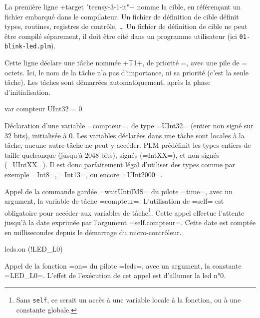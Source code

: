 La première ligne \plm+target "teensy-3-1-it"+ nomme la cible, en référençant un fichier embarqué dans le compilateur. Un fichier de définition de cible définit types, routines, registres de contrôle, … Un fichier de définition de cible ne peut être compilé séparement, il doit être cité dans un programme utilisateur (ici \texttt{01-blink-led.plm}).

\begin{PLM}[3]
task T1 priority 1 stackSize 512 {
\end{PLM}

Cette ligne déclare une tâche nommée \plm+T1+, de priorité =, avec une pile de = octets. Ici, le nom de la tâche n'a pas d'importance, ni sa priorité (c'est la seule tâche). Les tâches sont démarrées automatiquement, après la phase d'initialisation.

\begin{PLM}[4]
  var compteur UInt32 = 0
\end{PLM}

Déclaration d'une variable \plm=compteur=, de type \plm=UInt32= (entier non signé sur 32 bits), initialisée à 0. Les variables déclarées dans une tâche sont locales à la tâche, aucune autre tâche ne peut y accéder. PLM prédéfinit les types entiers de taille quelconque (jusqu'à 2048 bits), signés (\plm=IntXX=), et non signés (\plm=UIntXX=). Il est donc parfaitement légal d'utiliser des types comme par exemple \plm=Int8=, \plm=Int13=, ou encore \plm=UInt2000=.


\begin{PLM}[6]
  while time.waitUntilMS (!deadline:self.compteur) {
\end{PLM}

Appel de la commande gardée \plm=waitUntilMS= du pilote \plm=time=, avec un argument, la variable de tâche \plm=compteur=. L'utilisation de \plm=self= est obligatoire pour accéder aux variables de tâche\footnote{Sans \texttt{self}, ce serait un accès à une variable locale à la fonction, ou à une constante globale.}. Cette appel effectue l'attente jusqu'à la date exprimée par l'argument \plm=self.compteur=. Cette date est comptée en millisecondes depuis le démarrage du micro-contrôleur.



\begin{PLM}[7]
    leds.on (!LED_L0)
\end{PLM}

Appel de la fonction \plm=on= du pilote \plm=leds=, avec un argument, la constante \plm=LED_L0=. L'effet de l'exécution de cet appel est d'allumer la led n°0.



